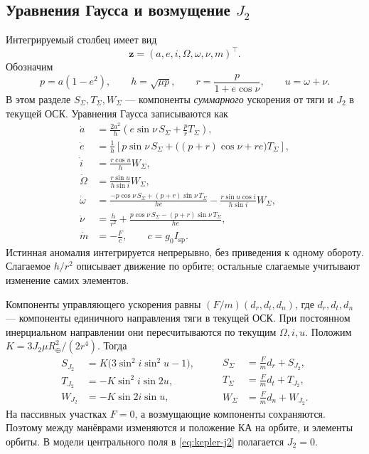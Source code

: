 \documentclass[a4paper,11pt]{article}
\newcommand{\vect}[1]{\boldsymbol{#1}}
\numberwithin{equation}{section}
\begin{document}
\subsection{Уравнения Гаусса и возмущение \texorpdfstring{$J_2$}{J2}}

Интегрируемый столбец имеет вид
\[
\vect z=(a,e,i,\Omega,\omega,\nu,m)^\top.
\]
Обозначим
\begin{equation}
p=a(1-e^2),\qquad h=\sqrt{\mu p},\qquad
r=\frac{p}{1+e\cos\nu},\qquad u=\omega+\nu.
\label{eq:kepler-geometry}
\end{equation}
В этом разделе $S_\Sigma,T_\Sigma,W_\Sigma$ --- компоненты
\emph{суммарного} ускорения от тяги и $J_2$ в текущей ОСК.
Уравнения Гаусса записываются как
\begin{equation}
\begin{aligned}
\dot a&=\frac{2a^2}{h}
 \left(e\sin\nu\,S_\Sigma+\frac{p}{r}T_\Sigma\right),\\
\dot e&=\frac1h\left[p\sin\nu\,S_\Sigma+
 \bigl((p+r)\cos\nu+re\bigr)T_\Sigma\right],\\
\dot i&=\frac{r\cos u}{h}W_\Sigma,\\
\dot\Omega&=\frac{r\sin u}{h\sin i}W_\Sigma,\\
\dot\omega&=\frac{-p\cos\nu\,S_\Sigma+(p+r)\sin\nu\,T_\Sigma}{he}
 -\frac{r\sin u\cos i}{h\sin i}W_\Sigma,\\
\dot\nu&=\frac{h}{r^2}
 +\frac{p\cos\nu\,S_\Sigma-(p+r)\sin\nu\,T_\Sigma}{he},\\
\dot m&=-\frac{F}{c},\qquad c=g_0I_{\mathrm{sp}}.
\end{aligned}
\label{eq:kepler-gauss}
\end{equation}
Истинная аномалия интегрируется непрерывно, без приведения
к одному обороту. Слагаемое $h/r^2$ описывает движение
по орбите; остальные слагаемые учитывают изменение самих элементов.

Компоненты управляющего ускорения равны
$(F/m)(d_r,d_t,d_n)$, где $d_r,d_t,d_n$ --- компоненты
единичного направления тяги в текущей ОСК.
При постоянном инерциальном направлении они пересчитываются
по текущим $\Omega,i,u$.
Положим $K=3J_2\mu R_\oplus^2/(2r^4)$. Тогда
\begin{equation}
\begin{aligned}
S_{J_2}&=K\bigl(3\sin^2i\sin^2u-1\bigr),\\
T_{J_2}&=-K\sin^2i\sin2u,\\
W_{J_2}&=-K\sin2i\sin u,
\end{aligned}
\qquad
\begin{aligned}
S_\Sigma&=\frac{F}{m}d_r+S_{J_2},\\
T_\Sigma&=\frac{F}{m}d_t+T_{J_2},\\
W_\Sigma&=\frac{F}{m}d_n+W_{J_2}.
\end{aligned}
\label{eq:kepler-j2}
\end{equation}
На пассивных участках $F=0$, а возмущающие компоненты
сохраняются. Поэтому между манёврами изменяются и положение
КА на орбите, и элементы орбиты. В модели центрального поля
в \eqref{eq:kepler-j2} полагается $J_2=0$.
\end{document}
